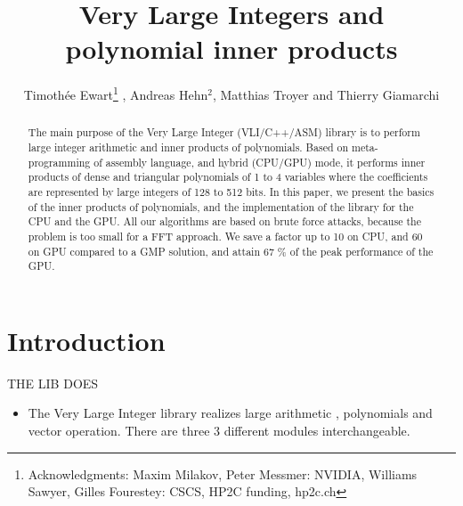 \documentclass[oribibl]{llncs2e/llncs}
\title{Very Large Integers  and polynomial inner products}
\author{Timoth\'ee Ewart\inst{1}\thanks{Acknowledgments: Maxim Milakov, Peter Messmer:   NVIDIA,   Williams Sawyer, Gilles Fourestey:  CSCS, HP2C funding, hp2c.ch}  , Andreas Hehn$^2$, Matthias Troyer\inst{2} and Thierry Giamarchi\inst{1}}
\institute{Universit\'e de Gen\`eve, \email{timothee.ewart@gmail.com}  \and Eidgen\"ossische Technische Hochschule Z\"urich }
\begin{document}
\maketitle
\begin{abstract}
The main purpose of the  Very Large Integer (VLI/C++/ASM) library is to perform large integer arithmetic and  inner products of polynomials. Based on meta-programming of assembly language,
and  hybrid (CPU/GPU) mode, it performs inner products of dense and triangular polynomials  of 1 to 4 variables  where the coefficients are represented  by large integers of 128 to 512 bits. 
In this paper, we present the basics of the inner products of polynomials, and  the implementation of the library for the CPU and the GPU.  All our algorithms are based on brute force attacks, because the problem is too small for a FFT approach. We save a factor up to 10 on CPU, and 60 on GPU compared to a GMP solution,
and attain 67 \% of the peak performance of the GPU.
\end{abstract}
\section{Introduction}

 THE LIB DOES
\begin{itemize}
\item The Very Large Integer library realizes large arithmetic , polynomials  and vector operation.  There are three 3 different modules interchangeable. 
\end{itemize}
\end{document}
